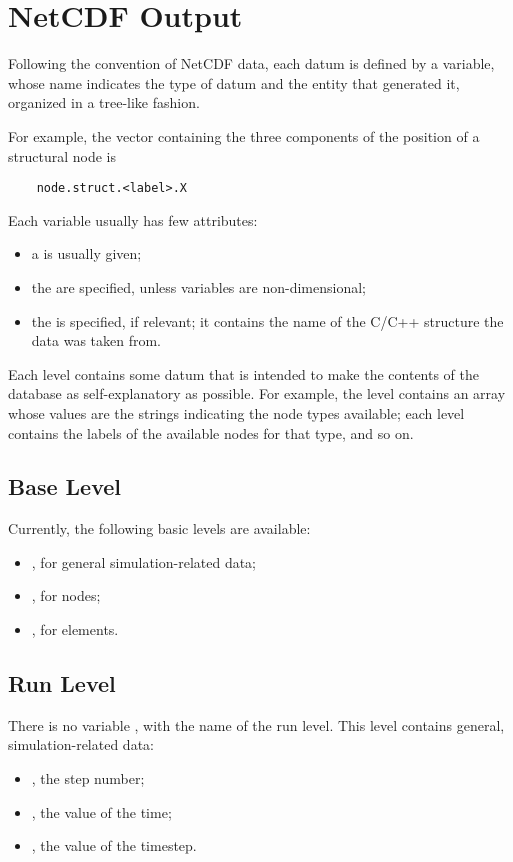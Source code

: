 \section{NetCDF Output}

Following the convention of NetCDF data, each datum is defined
by a variable, whose name indicates the type of datum and the entity
that generated it, organized in a tree-like fashion.

For example, the vector containing the three components 
of the position of a structural node is
\begin{verbatim}
    node.struct.<label>.X
\end{verbatim}
Each variable usually has few attributes:
\begin{itemize}
\item a  is usually given;
\item the  are specified, unless variables are non-dimensional;
\item the  is specified, if relevant;
it contains the name of the C/C++ structure the data was taken from.
\end{itemize}

Each level contains some datum that is intended to make the contents
of the database as self-explanatory as possible.
For example, the level  contains an array whose values
are the strings indicating the node types available;
each level  contains the labels of the available nodes
for that type, and so on.



\subsection{Base Level}
Currently, the following basic levels are available:
\begin{itemize}
\item {}, for general simulation-related data;
\item {}, for nodes;
\item {}, for elements.
\end{itemize}



\subsection{Run Level}
There is no variable , with the name of the run level.
This level contains general, simulation-related data:
\begin{itemize}
\item {}, the step number;
\item {}, the value of the time;
\item {}, the value of the timestep.
\end{itemize}



